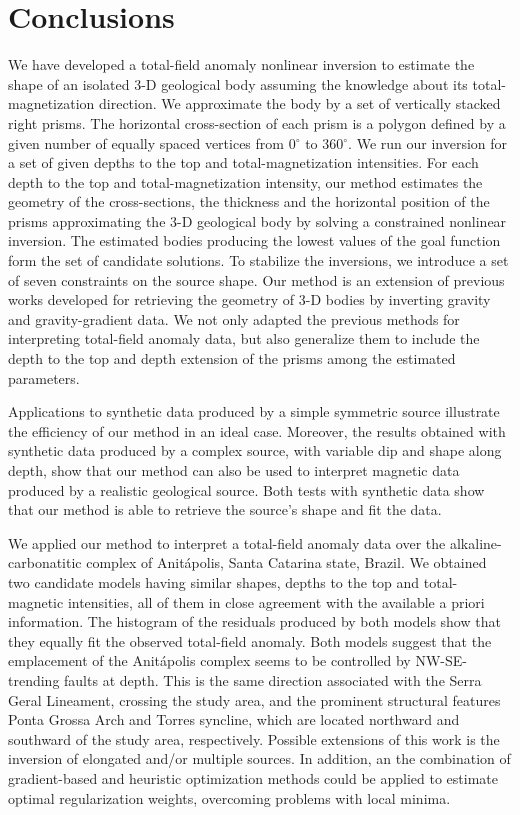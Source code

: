 \section{Conclusions}

We have developed a total-field anomaly nonlinear inversion to estimate the shape 
of an isolated 3-D geological body assuming the knowledge about its 
total-magnetization direction. We approximate the body by a set of vertically 
stacked right prisms. The horizontal cross-section of each prism is a polygon 
defined by a given number of equally spaced vertices from 0$^\circ$ to 360$^\circ$. 
We run our inversion for a set of given depths to the top and total-magnetization 
intensities. For each depth to the top and total-magnetization intensity,
our method estimates the geometry of the cross-sections, the thickness and 
the horizontal position of the prisms approximating the 3-D geological body by 
solving a constrained nonlinear inversion.
The estimated bodies producing the lowest values of the goal function form the 
set of candidate solutions. 
To stabilize the inversions, we introduce a set of seven constraints on the source 
shape.
Our method is an extension of previous works developed for retrieving the geometry 
of 3-D bodies by inverting gravity and gravity-gradient data. 
We not only adapted the previous methods for interpreting total-field anomaly data,
but also generalize them to include the depth to the top and depth extension of 
the prisms among the estimated parameters.

Applications to synthetic data produced by a simple symmetric source 
illustrate the efficiency of our method in an ideal case. Moreover, the results 
obtained with synthetic data produced by a complex source, with variable dip and 
shape along depth, show that our method can also be used to interpret magnetic 
data produced by a realistic geological source. 
Both tests with synthetic data show that our method is able to retrieve the 
source's shape and fit the data.

We applied our method to interpret a total-field anomaly data over the 
alkaline-carbonatitic complex of Anit{\'a}polis, Santa Catarina state, Brazil. 
We obtained two candidate models having similar shapes, depths to the top and 
total-magnetic intensities, all of them in close agreement with the available 
a priori information. 
The histogram of the residuals produced by both models show that they equally 
fit the observed total-field anomaly.
Both models suggest that the emplacement of the 
Anit{\'a}polis complex seems to be controlled by NW-SE-trending faults at depth.
This is the same direction associated with the Serra Geral Lineament, 
crossing the study area, and the prominent structural features 
Ponta Grossa Arch and Torres syncline, which are located 
northward and southward of the study area, respectively.
Possible extensions of this work is the inversion of elongated and/or multiple 
sources. In addition, an the combination of gradient-based and heuristic optimization 
methods could be applied to estimate optimal regularization weights, 
overcoming problems with local minima.